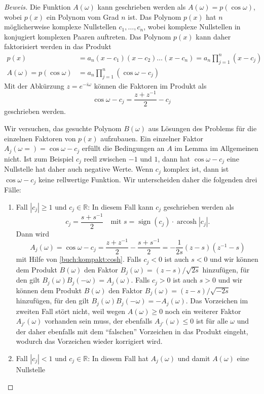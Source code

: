 \begin{proof}[Beweis]
Die Funktion $A(\omega)$ kann geschrieben werden als
$A(\omega) = p(\cos\omega)$, wobei $p(x)$ ein Polynom vom
Grad $n$ ist.
Das Polynom $p(x)$ hat $n$ möglicherweise komplexe Nullstellen
$c_1,\dots,c_n$, wobei komplexe Nullstellen in konjugiert komplexen
Paaren auftreten.
Das Polynom $p(x)$ kann daher faktorisiert werden in das Produkt
\begin{align*}
p(x)
&=
a_n(x-c_1)(x-c_2)\dots(x-c_n)
=
a_n \prod_{j=1}^n (x-c_j)
\\
A(\omega) = p(\cos\omega)
&=
a_n \prod_{j=1}^n (\cos \omega - c_j)
\end{align*}
Mit der Abkürzung $z=e^{-i\omega}$ können die Faktoren im Produkt als
\[
\cos\omega -c_j = \frac{z+z^{-1}}2-c_j
\]
geschrieben werden.

Wir versuchen, das gesuchte Polynom $B(\omega)$ aus Lösungen des Problems
für die einzelnen Faktoren von $p(x)$ aufzubauen.
Ein einzelner Faktor $A_j(\omega=)=\cos\omega - c_j$ erfüllt die Bedingungen an
$A$ im Lemma im Allgemeinen nicht.
Ist zum Beispiel $c_j$ reell zwischen $-1$ und $1$, dann hat
$\cos\omega-c_j$ eine Nullstelle hat daher auch negative Werte.
Wenn $c_j$ komplex ist, dann ist $\cos\omega-c_j$ keine rellwertige
Funktion.
Wir unterscheiden daher die folgenden drei Fälle:
\begin{enumerate}
\item
Fall $|c_j|\ge 1$ und $c_j\in\mathbb R$:
In diesem Fall kann $c_j$ geschrieben werden als
\[
c_j = \frac{s+s^{-1}}2
\quad
\text{mit $s=\operatorname{sign}(c_j)\cdot \operatorname{arcosh}|c_j|$.}
\]
Dann wird
\[
A_j(\omega)
=
\cos\omega - c_j
=
\frac{z+z^{-1}}2 - \frac{s+s^{-1}}2
=
-\frac1{2s} (z-s)(z^{-1}-s)
\]
mit Hilfe von \eqref{buch:kompakt:cosh}.
Falls $c_j < 0$ ist auch $s<0$ und wir können dem Produkt $B(\omega)$
den Faktor $B_j(\omega)=(z-s)/\sqrt{2s}$ hinzufügen, für den gilt
$B_j(\omega)B_j(-\omega)=A_j(\omega)$.
Falls $c_j > 0$ ist auch $s>0$ und wir können dem Produkt $B(\omega)$
den Faktor $B_j(\omega) =(z-s)/\sqrt{-2s}$ hinzufügen, für den
gilt $B_j(\omega)B_j(-\omega)=-A_j(\omega)$.
Das Vorzeichen im zweiten Fall stört nicht, weil wegen $A(\omega)\ge 0$
noch ein weiterer Faktor $A_{j'}(\omega)$ vorhanden sein muss, der ebenfalls
$A_{j'}(\omega)\le 0$ ist für alle $\omega$ und der daher ebenfalls
mit dem ``falschen'' Vorzeichen in das Produkt eingeht, wodurch das
Vorzeichen wieder korrigiert wird.
\item
Fall $|c_j| < 1$ und $c_j\in\mathbb R$:
In diesem Fall hat $A_j(\omega)$ und damit $A(\omega)$ eine Nullstelle

\end{enumerate}
\end{proof}
